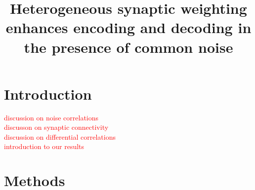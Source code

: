 \documentclass[11pt]{article}
\title{Heterogeneous synaptic weighting enhances encoding and decoding in the presence of common noise}
\date{}
\begin{document}
	\maketitle
	
	\section{Introduction}
	\textcolor{red}{discussion on noise correlations} \\
	\textcolor{red}{discusson on synaptic connectivity} \\
	\textcolor{red}{discussion on differential correlations} \\
	\textcolor{red}{introduction to our results}
	
	\newpage 
	
	\section{Methods}
\end{document}
